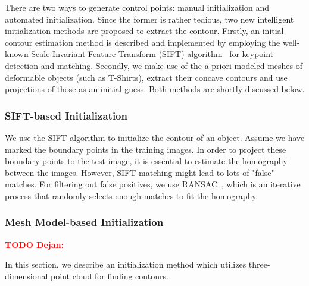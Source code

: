 \documentclass[conference]{IEEEtran}
\newcommand{\todod}[1]{\textbf{\textcolor{red}{TODO Dejan: #1}}}
\begin{document}
There are two ways to generate control points:
manual initialization and automated initialization. 
Since the former is rather tedious, two new
intelligent initialization methods are proposed to extract the
contour. Firstly, an initial contour estimation method is described and
implemented by employing the well-known Scale-Invariant Feature Transform 
(SIFT) algorithm~\cite{lowe2004distinctive} for
keypoint detection and matching. Secondly, we make use of the a priori
modeled meshes of deformable objects (such as T-Shirts), extract their
concave contours and use projections of those as an initial guess. Both 
methods are shortly discussed below.

\subsubsection{SIFT-based Initialization}
\label{sec:sift}
We use the SIFT algorithm to initialize the
contour of an object. Assume we have marked the boundary points in the
training images. In order to project these boundary points to the test
image, it is essential to estimate the homography between the
images. However, SIFT matching might lead to lots of "false" matches.
For filtering out false positives, we use RANSAC~\cite{fischler1981random}, 
which is an iterative process that randomly selects enough matches to fit the
homography.

\subsubsection{Mesh Model-based Initialization}
\label{sec:pcl}
\todod{}



In this section, we describe an initialization method which utilizes three-dimensional
point cloud for finding contours.
\end{document}
